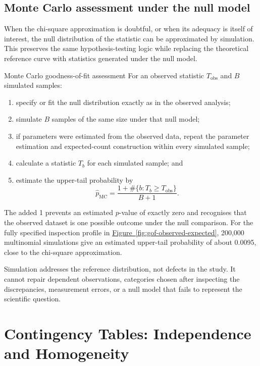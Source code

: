 \subsection{Monte Carlo assessment under the null model}

When the chi-square approximation is doubtful, or when its adequacy is itself of interest, the null distribution of the statistic can be approximated by simulation. This preserves the same hypothesis-testing logic while replacing the theoretical reference curve with statistics generated under the null model.

\begin{custombox}{Monte Carlo goodness-of-fit assessment}
For an observed statistic $T_{\mathrm{obs}}$ and $B$ simulated samples:
\begin{enumerate}
  \item specify or fit the null distribution exactly as in the observed analysis;
  \item simulate $B$ samples of the same size under that null model;
  \item if parameters were estimated from the observed data, repeat the parameter estimation and expected-count construction within every simulated sample;
  \item calculate a statistic $T_b$ for each simulated sample; and
  \item estimate the upper-tail probability by
  \[
  \hat p_{\mathrm{MC}}
  =\frac{1+\#\{b:T_b\geq T_{\mathrm{obs}}\}}{B+1}.
  \]
\end{enumerate}
\end{custombox}

The added 1 prevents an estimated $p$-value of exactly zero and recognises that the observed dataset is one possible outcome under the null comparison. For the fully specified inspection profile in \hyperref[fig:gof-observed-expected]{Figure~\ref*{fig:gof-observed-expected}}, 200,000 multinomial simulations give an estimated upper-tail probability of about 0.0095, close to the chi-square approximation.

Simulation addresses the reference distribution, not defects in the study. It cannot repair dependent observations, categories chosen after inspecting the discrepancies, measurement errors, or a null model that fails to represent the scientific question.

\section{Contingency Tables: Independence and Homogeneity}
\label{sec:chi-square-contingency}

